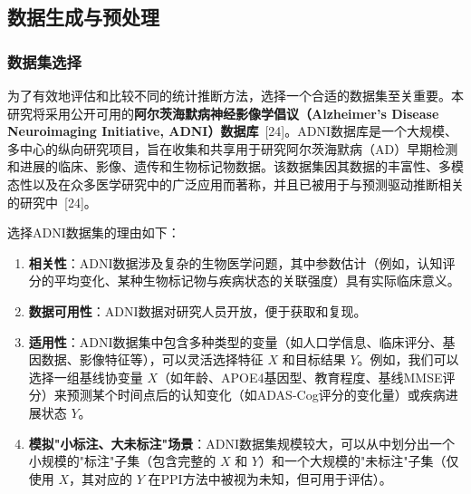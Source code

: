\documentclass[12pt,a4paper]{article}
\begin{document}
\subsection{数据生成与预处理}
\label{sec:dataset_preprocessing}

\subsubsection{数据集选择}
\label{sec:dataset_selection}
为了有效地评估和比较不同的统计推断方法，选择一个合适的数据集至关重要。本研究将采用公开可用的\textbf{阿尔茨海默病神经影像学倡议（Alzheimer's Disease Neuroimaging Initiative, ADNI）数据库}~{[24]}。ADNI数据库是一个大规模、多中心的纵向研究项目，旨在收集和共享用于研究阿尔茨海默病（AD）早期检测和进展的临床、影像、遗传和生物标记物数据。该数据集因其数据的丰富性、多模态性以及在众多医学研究中的广泛应用而著称，并且已被用于与预测驱动推断相关的研究中~{[24]}。

选择ADNI数据集的理由如下：
\begin{enumerate}
    \item \textbf{相关性}：ADNI数据涉及复杂的生物医学问题，其中参数估计（例如，认知评分的平均变化、某种生物标记物与疾病状态的关联强度）具有实际临床意义。
    \item \textbf{数据可用性}：ADNI数据对研究人员开放，便于获取和复现。
    \item \textbf{适用性}：ADNI数据集中包含多种类型的变量（如人口学信息、临床评分、基因数据、影像特征等），可以灵活选择特征 $X$ 和目标结果 $Y$。例如，我们可以选择一组基线协变量 $X$（如年龄、APOE4基因型、教育程度、基线MMSE评分）来预测某个时间点后的认知变化（如ADAS-Cog评分的变化量）或疾病进展状态 $Y$。
    \item \textbf{模拟"小标注、大未标注"场景}：ADNI数据集规模较大，可以从中划分出一个小规模的"标注"子集（包含完整的 $X$ 和 $Y$）和一个大规模的"未标注"子集（仅使用 $X$，其对应的 $Y$ 在PPI方法中被视为未知，但可用于评估）。
\end{enumerate}
\end{document}
